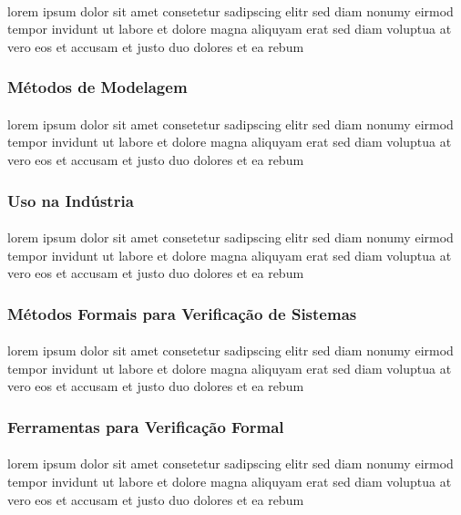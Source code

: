 \paragraph{}
lorem ipsum dolor sit amet consetetur sadipscing elitr sed diam nonumy
eirmod tempor invidunt ut labore et dolore magna aliquyam erat sed diam
voluptua at vero eos et accusam et justo duo dolores et ea rebum

\subsubsection{Métodos de Modelagem}
\paragraph{}
lorem ipsum dolor sit amet consetetur sadipscing elitr sed diam nonumy
eirmod tempor invidunt ut labore et dolore magna aliquyam erat sed diam
voluptua at vero eos et accusam et justo duo dolores et ea rebum

\subsubsection{Uso na Indústria}
\paragraph{}
lorem ipsum dolor sit amet consetetur sadipscing elitr sed diam nonumy
eirmod tempor invidunt ut labore et dolore magna aliquyam erat sed diam
voluptua at vero eos et accusam et justo duo dolores et ea rebum

\subsubsection{Métodos Formais para Verificação de Sistemas}
\paragraph{}
lorem ipsum dolor sit amet consetetur sadipscing elitr sed diam nonumy
eirmod tempor invidunt ut labore et dolore magna aliquyam erat sed diam
voluptua at vero eos et accusam et justo duo dolores et ea rebum

\subsubsection{Ferramentas para Verificação Formal}
\paragraph{}
lorem ipsum dolor sit amet consetetur sadipscing elitr sed diam nonumy
eirmod tempor invidunt ut labore et dolore magna aliquyam erat sed diam
voluptua at vero eos et accusam et justo duo dolores et ea rebum

